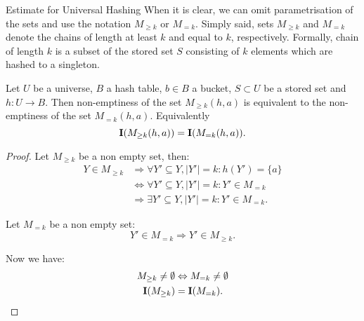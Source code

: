 \begin{section}{Estimate for Universal Hashing}
When it is clear, we can omit parametrisation of the sets and use the notation $M_{\geq k}$ or $M_{= k}$. Simply said, sets $M_{\geq k}$ and $M_{= k}$ denote the chains of length at least $k$ and equal to $k$, respectively. Formally, chain of length $k$ is a subset of the stored set $S$ consisting of $k$ elements which are hashed to a singleton.

\begin{lemma}
\label{lemma-indicator-k-collision}
Let $U$ be a universe, $B$ a hash table, $b \in B$ a bucket, $S \subset U$ be a stored set and $h: U \rightarrow B$. Then non-emptiness of the set $M_{\geq k}(h, a)$ is equivalent to the non-emptiness of the set $M_{= k}(h, a)$. Equivalently
\begin{displaymath}
\mathbf{I}(M_{\geq k}(h, a)) = \mathbf{I}(M_{= k}(h, a)) \text{.}
\end{displaymath}
\begin{proof}
Let $M_{\geq k}$ be a non empty set, then:
\begin{displaymath}
\begin{split}
Y \in M_{\geq k} 
	& \Rightarrow \forall Y' \subseteq Y, |Y'| = k: h(Y') = \{a\} \\
	& \Leftrightarrow \forall Y' \subseteq Y, |Y'| = k: Y' \in M_{=k} \\
	& \Rightarrow \exists Y' \subseteq Y, |Y'| = k: Y' \in M_{=k} \text{.}
\end{split}
\end{displaymath}

Let $M_{=k}$ be a non empty set:
\begin{displaymath}
Y' \in M_{=k} \Rightarrow Y' \in M_{\geq k} \text{.}
\end{displaymath}

Now we have:
\begin{displaymath}
\begin{split}
M_{\geq k} \neq \emptyset & \Leftrightarrow  M_{= k} \neq \emptyset \\
\mathbf{I}(M_{\geq k}) & = \mathbf{I}(M_{= k}) \text{.}
\end{split}
\end{displaymath}
\end{proof}
\end{lemma}


\end{section}
